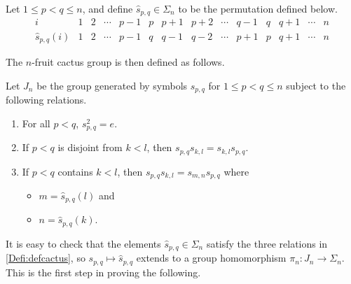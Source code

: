 \documentclass{amsbook} %
\numberwithin{section}{chapter}
\begin{document}
\begin{Defi}
Let $1 \leq p < q \leq n$, and define $\hat{s}_{p,q} \in \Sigma_{n}$ to be the permutation defined below.
  \[
    \begin{array}{r|ccccccccccccc}
      i & 1 & 2 & \cdots & p-1 & p & p+1 & p+2 & \cdots & q-1 & q & q+1 & \cdots & n \\
      \hat{s}_{p,q}(i) & 1 & 2 & \cdots & p-1 & q & q-1 & q-2 & \cdots & p+1 & p & q+1 & \cdots & n
    \end{array}
  \]
\end{Defi}

The $n$-fruit cactus group is then defined as follows.

\begin{Defi}\label{Defi:defcactus}
Let $J_{n}$ be the group generated by symbols $s_{p,q}$ for $1 \leq p < q \leq n$ subject to the following relations.
  \begin{enumerate}
    \item For all $p < q$, $s_{p,q}^{2}=e$.
    \item If $p<q$ is disjoint from $k<l$, then $s_{p,q}s_{k,l} = s_{k,l}s_{p,q}$.
    \item If $p<q$ contains $k<l$, then $s_{p,q}s_{k,l} = s_{m,n}s_{p,q}$ where
      \begin{itemize}
        \item $m = \hat{s}_{p,q}(l)$ and
        \item $n = \hat{s}_{p,q}(k)$.
      \end{itemize}
  \end{enumerate}
\end{Defi}

It is easy to check that the elements $\hat{s}_{p,q} \in \Sigma_{n}$ satisfy the three relations in  \cref{Defi:defcactus}, so $s_{p,q} \mapsto \hat{s}_{p,q}$ extends to a group homomorphism $\pi_{n} \colon J_{n} \rightarrow \Sigma_{n}$.  This is the first step in proving the following.
\end{document}
